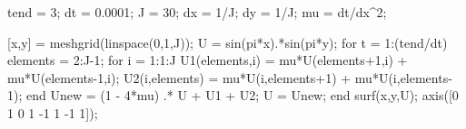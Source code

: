 tend = 3;
dt = 0.0001;
J = 30;
dx = 1/J;
dy = 1/J;
mu = dt/dx^2;

[x,y] = meshgrid(linspace(0,1,J));
U = sin(pi*x).*sin(pi*y); 
for t = 1:(tend/dt)
    elements = 2:J-1;  
    for i = 1:1:J
        U1(elements,i) = mu*U(elements+1,i) + mu*U(elements-1,i); 
        U2(i,elements) = mu*U(i,elements+1) + mu*U(i,elements-1);
    end
    Unew = (1 - 4*mu) .* U + U1 + U2;
    U = Unew;  
end
surf(x,y,U); axis([0 1 0 1 -1 1 -1 1]);



